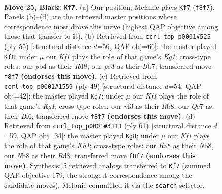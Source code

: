 \documentclass[11pt]{article}
\begin{document}
\clearpage

\begin{figure}[p]\centering
\begin{subfigure}{0.46\textwidth}\centering
\resizebox{\linewidth}{!}{%
\newchessgame
\chessboard[
  setfen={rnb2k2/p1q5/2p1p1p1/P1PpP1P1/1P6/2P2N2/5K2/R1BQ4 b - - 4 25},
  showmover=false,
  pgfstyle=straightmove, color=movearrow, markmove={f8-f7}
]}
\caption{}
\end{subfigure}\hfill
\begin{subfigure}{0.46\textwidth}\centering
\resizebox{\linewidth}{!}{%
\newchessgame
\chessboard[
  setfen={3r2k1/1b1n1p2/p1pq2pp/Pp6/1P1P3P/1Q3NP1/5PB1/2R4K b - - 1 28},
  showmover=false,
  pgfstyle=straightmove, color=movearrow, markmove={g8-f8}
]}
\caption{}
\end{subfigure}
\\[4pt]
\begin{subfigure}{0.46\textwidth}\centering
\resizebox{\linewidth}{!}{%
\newchessgame
\chessboard[
  setfen={1r4k1/2qb4/1p1p1bpp/3Ppp2/2P4P/Q2P2P1/3N1PB1/R5K1 b - - 2 25},
  showmover=false,
  pgfstyle=straightmove, color=movearrow, markmove={g8-g7}
]}
\caption{}
\end{subfigure}\hfill
\begin{subfigure}{0.46\textwidth}\centering
\resizebox{\linewidth}{!}{%
\newchessgame
\chessboard[
  setfen={1n1r1b1k/pp3qp1/5p2/N3p2p/7P/P1B1P1P1/1PQ2P2/R5K1 b - - 1 31},
  showmover=false,
  pgfstyle=straightmove, color=movearrow, markmove={h8-g8}
]}
\caption{}
\end{subfigure}
\caption{\textbf{Move 25, Black: \texttt{Kf7}.} (a) Our position; Melanie plays \texttt{Kf7} (\texttt{f8f7}). Panels (b)--(d) are the retrieved master positions whose correspondence most drove this move (highest QAP objective among those that transfer to it). (b) Retrieved from \texttt{ccrl\_top\_p0001\#525} (ply 55) [structural distance $d$=56, QAP obj=66]: the master played \texttt{Kf8}; under $\mu$ our \emph{Kf1} plays the role of that game's \emph{Kg1}; cross-type roles: our \emph{p}b4 as their \emph{R}d8, our \emph{p}c3 as their \emph{B}b7; transferred move \texttt{f8f7} \textbf{(endorses this move)}. (c) Retrieved from \texttt{ccrl\_top\_p0001\#1559} (ply 49) [structural distance $d$=54, QAP obj=42]: the master played \texttt{Kg7}; under $\mu$ our \emph{Kf1} plays the role of that game's \emph{Kg1}; cross-type roles: our \emph{n}f3 as their \emph{R}b8, our \emph{Q}c7 as their \emph{B}f6; transferred move \texttt{f8f7} \textbf{(endorses this move)}. (d) Retrieved from \texttt{ccrl\_top\_p0001\#3111} (ply 61) [structural distance $d$=59, QAP obj=34]: the master played \texttt{Kg8}; under $\mu$ our \emph{Kf1} plays the role of that game's \emph{Kh1}; cross-type roles: our \emph{R}a8 as their \emph{N}b8, our \emph{N}b8 as their \emph{R}d8; transferred move \texttt{f8f7} \textbf{(endorses this move)}. Synthesis: 5 retrieved analogs transferred to \texttt{Kf7} (summed QAP objective 179, the strongest correspondence among the candidate moves); Melanie committed it via the \texttt{search} selector.}
\label{fig:thought-m49}
\end{figure}
\end{document}
